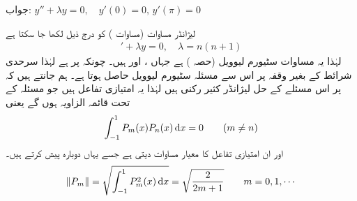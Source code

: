 جواب:
$y''+\lambda y=0, \quad y'(0)=0, \, y'(\pi)=0$

لیژانڈر  مساوات (مساوات ) کو درج ذیل لکھا جا سکتا ہے
\begin{align}
[(1-x^2)y']'+\lambda y=0,\quad \lambda=n(n+1)
\end{align}
لہٰذا یہ  مساوات سٹیورم لیوویل (حصہ ) ہے جہاں ،  اور  ہیں۔ چونکہ  پر  ہے لہٰذا  سرحدی شرائط کے بغیر وقفہ  پر اس سے مسئلہ سٹیورم لیوویل حاصل ہوتا ہے۔  ہم جانتے ہیں کہ  پر اس مسئلے کے حل لیژانڈر کثیر رکنی  ہیں لہٰذا یہ امتیازی تفاعل ہیں جو مسئلہ  کے تحت  قائمہ الزاویہ ہوں گے یعنی
\begin{align}
\int_{-1}^{1}P_m(x)P_n(x)\dif x=0\quad \quad (m \ne n)
\end{align}
اور ان امتیازی تفاعل کا معیار مساوات  دیتی ہے جسے یہاں دوبارہ پیش کرتے ہیں۔
\begin{align}\label{مساوات_طاقتی_معیار_دوبارہ_پیش}
\norm{P_m}=\sqrt{\int_{-1}^{1} P_m^2(x) \dif x}=\sqrt{\frac{2}{2m+1}}\quad \quad m=0,1,\cdots
\end{align}

